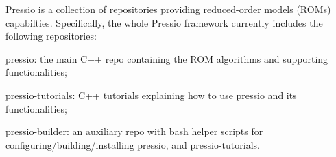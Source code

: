 Pressio is a collection of repositories providing reduced-\/order models (R\+O\+Ms) capabilties. Specifically, the whole Pressio framework currently includes the following repositories\+:


\begin{DoxyItemize}
\item {\ttfamily pressio}\+: the main C++ repo containing the R\+OM algorithms and supporting functionalities;
\item {\ttfamily pressio-\/tutorials}\+: C++ tutorials explaining how to use {\ttfamily pressio} and its functionalities;
\item {\ttfamily pressio-\/builder}\+: an auxiliary repo with bash helper scripts for configuring/building/installing {\ttfamily pressio}, and {\ttfamily pressio-\/tutorials}. 
\end{DoxyItemize}